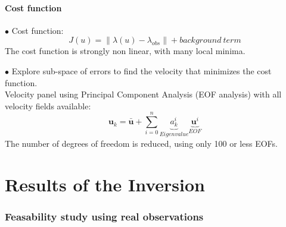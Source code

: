 \documentclass[compress,slidescentered,notes=show]{beamer}
\begin{document}
	\subsection{Cost function}
\begin{frame}
  \begin{block}{}
    $\bullet$ Cost function:
    $$J(u)=\|\lambda(u)- \lambda_{obs}\| + background\ term $$
    The cost function is strongly non linear, with many local minima.\\
  \end{block}
  \vspace{0.6cm}
  \begin{block}{}
    $\bullet$ Explore sub-space of errors to find the velocity that minimizes the cost function. \\
    Velocity panel using Principal Component Analysis (EOF analysis) with all velocity fields available:
    $$\textbf{u}_k = \bar{\textbf{u}} + \sum_{i=0}^n{\underbrace{a_k^i}_{Eigenvalue}\underbrace{\textbf{u}^i}_{EOF_{}}}$$
    The number of degrees of freedom is reduced, using only 100 or less EOFs. \\
  \end{block}
  \vspace{0.2cm}

\end{frame}

\part{Results of the Inversion}

\begin{frame}
  \frametitle{\insertromanpartnumber \hspace{1em} \insertpart}
  \tableofcontents[hideotherpart]
\end{frame}

\section[Real data]{Feasability study using real observations}
\end{document}
